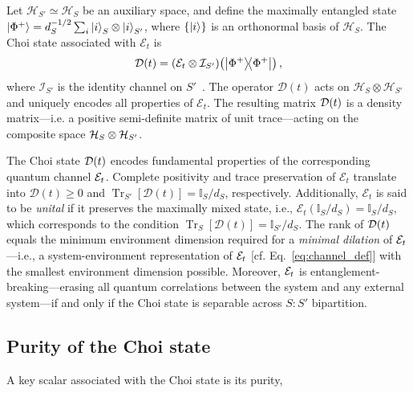 \documentclass[pra,twocolumn,aps,showpacs,superscriptaddress,longbibliography]{revtex4-2}%
\begin{document}
Let $\mathcal{H}_{S'}\simeq\mathcal{H}_S$ be an auxiliary space, and define the maximally entangled state $\ket{\Phi^+}=d_S^{-1/2}\sum_i \ket{i}_S\otimes\ket{i}_{S'}$, where $\{\ket{i}\}$ is an orthonormal basis of $\mathcal{H}_S$. The Choi state associated with $\mathcal{E}_t$ is
\begin{equation}\label{eq:choi_def}
\mathcal{D}(t)=(\mathcal{E}_t\otimes\mathcal{I}_{S'})\!\left(\dyad{\Phi^+}\right),
\end{equation}
where $\mathcal{I}_{S'}$ is the identity channel on $S'$~\cite{bengtsson_2006_geometry}. The operator $\mathcal{D}(t)$ acts on $\mathcal{H}_S\otimes\mathcal{H}_{S'}$ and uniquely encodes all properties of $\mathcal{E}_t$. The resulting matrix $\mathcal{D}(t)$ is a density matrix---i.e. a positive semi-definite matrix of unit trace---acting on the composite space $\mathcal{H}_S \otimes \mathcal{H}_{S'}$.

The Choi state $\mathcal{D}(t)$ encodes fundamental properties of the corresponding quantum channel $\mathcal{E}_t$. 
Complete positivity and trace preservation of $\mathcal{E}_t$ translate into $\mathcal{D}(t)\ge0$ and $\operatorname{Tr}_{S'}[\mathcal{D}(t)]=\mathbb{I}_S/d_S$, respectively. 
Additionally, $\mathcal{E}_t$ is said to be \textit{unital} if it preserves the maximally mixed state, i.e., $\mathcal{E}_t(\mathbb{I}_S/d_S) = \mathbb{I}_S/d_S$, which corresponds to the condition $\operatorname{Tr}_{S}[\mathcal{D}(t)] = \mathbb{I}_{S'}/d_{S}$.
The rank of $\mathcal{D}(t)$ equals the minimum environment dimension required for a \textit{minimal dilation} of $\mathcal{E}_t$---i.e., a system-environment representation of $\mathcal{E}_t$  [cf. Eq.~\eqref{eq:channel_def}] with the smallest environment dimension possible. Moreover, $\mathcal{E}_t$ is entanglement-breaking---erasing all quantum correlations between the system and any external system---if and only if the Choi state is separable across $S{:}S'$ bipartition.


\subsection{Purity of the Choi state}
A key scalar associated with the Choi state is its purity,
\end{document}
